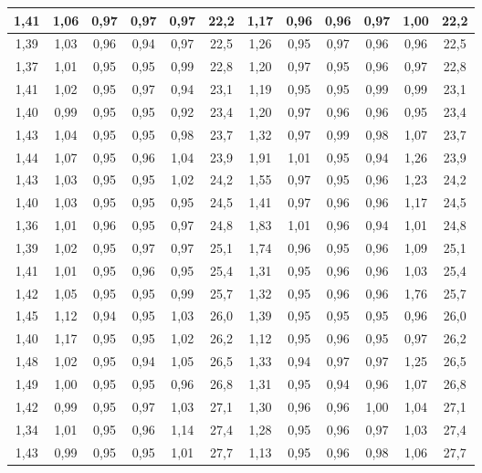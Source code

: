 \begin{table}[H]
\begin{center}
{\begin{tabular}{| c | c | c | c | c | c | c | c | c | c | c | c |}
\hline
1,41 &	1,06 &	0,97 &	0,97 &	0,97 &	22,2 & 1,17 & 0,96 & 0,96 & 0,97 & 1,00 & 22,2\\
\hline
1,39 &	1,03 &	0,96 &	0,94 &	0,97 &	22,5 & 1,26 & 0,95 & 0,97 & 0,96 & 0,96 & 22,5\\
\hline
1,37 &	1,01 &	0,95 &	0,95 &	0,99 &	22,8 & 1,20 & 0,97 & 0,95 & 0,96 & 0,97 & 22,8\\
\hline
1,41 &	1,02 &	0,95 &	0,97 &	0,94 &	23,1 & 1,19 & 0,95 & 0,95 & 0,99 & 0,99 & 23,1\\
\hline
1,40 &	0,99 &	0,95 &	0,95 &	0,92 &	23,4 & 1,20 & 0,97 & 0,96 & 0,96 & 0,95 & 23,4\\
\hline
1,43 &	1,04 &	0,95 &	0,95 &	0,98 &	23,7 & 1,32 & 0,97 & 0,99 & 0,98 & 1,07 & 23,7\\
\hline
1,44 &	1,07 &	0,95 &	0,96 &	1,04 &	23,9 & 1,91 & 1,01 & 0,95 & 0,94 & 1,26 & 23,9\\
\hline
1,43 &	1,03 &	0,95 &	0,95 &	1,02 &	24,2 & 1,55 & 0,97 & 0,95 & 0,96 & 1,23 & 24,2\\
\hline
1,40 &	1,03 &	0,95 &	0,95 &	0,95 &	24,5 & 1,41 & 0,97 & 0,96 & 0,96 & 1,17 & 24,5\\
\hline
1,36 &	1,01 &	0,96 &	0,95 &	0,97 &	24,8 & 1,83 & 1,01 & 0,96 & 0,94 & 1,01 & 24,8\\
\hline
1,39 &	1,02 &	0,95 &	0,97 &	0,97 &	25,1 & 1,74 & 0,96 & 0,95 & 0,96 & 1,09 & 25,1\\
\hline
1,41 &	1,01 &	0,95 &	0,96 &	0,95 &	25,4 & 1,31 & 0,95 & 0,96 & 0,96 & 1,03 & 25,4\\
\hline
1,42 &	1,05 &	0,95 &	0,95 &	0,99 &	25,7 & 1,32 & 0,95 & 0,96 & 0,96 & 1,76 & 25,7\\
\hline
1,45 &	1,12 &	0,94 &	0,95 &	1,03 &	26,0 & 1,39 & 0,95 & 0,95 & 0,95 & 0,96 & 26,0\\
\hline
1,40 &	1,17 &	0,95 &	0,95 &	1,02 &	26,2 & 1,12 & 0,95 & 0,96 & 0,95 & 0,97 & 26,2\\
\hline
1,48 &	1,02 &	0,95 &	0,94 &	1,05 &	26,5 & 1,33 & 0,94 & 0,97 & 0,97 & 1,25 & 26,5\\
\hline
1,49 &	1,00 &	0,95 &	0,95 &	0,96 &	26,8 & 1,31 & 0,95 & 0,94 & 0,96 & 1,07 & 26,8\\
\hline
1,42 &	0,99 &	0,95 &	0,97 &	1,03 &	27,1 & 1,30 & 0,96 & 0,96 & 1,00 & 1,04 & 27,1\\
\hline
1,34 &	1,01 &	0,95 &	0,96 &	1,14 &	27,4 & 1,28 & 0,95 & 0,96 & 0,97 & 1,03 & 27,4\\
\hline
1,43 &	0,99 &	0,95 &	0,95 &	1,01 &	27,7 & 1,13 & 0,95 & 0,96 & 0,98 & 1,06 & 27,7\\

\end{tabular}}
\end{center}
\end{table}
